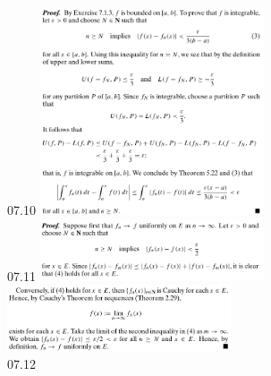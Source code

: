 \documentclass[3pt,landscape]{article}
\begin{document}
\begin{multicols}{3}
    07.10
    \includegraphics[width=250]{07_10.png} \\
    07.11
    \includegraphics[width=250]{07_11a.png} \\
    \includegraphics[width=250]{07_11b.png} \\
    07.12

\end{multicols}
\end{document}
